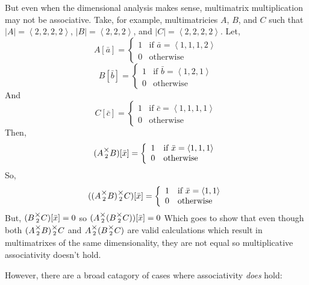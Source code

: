 \documentclass[12pt]{article}
\theoremstyle{definition}
\theoremstyle{plain}
\theoremstyle{ppart}
\newcommand{\mmult}[1]{\text{\raisebox{1ex}{$\underset{#1}{\times}$}}}
\begin{document}
But even when the dimensional analysis makes sense, multimatrix multiplication
may not be associative. Take, for example, multimatricies $A$, $B$, and $C$ such
that $|A| = \left<2,2,2,2\right>$, $|B| = \left<2,2,2\right>$, and
$|C| = \left<2,2,2,2\right>$. Let,
\[
 A[\bar{a}] = 
  \left\{
    \begin{array}{ll}
      1 & \mbox{if } \bar{a} = \left<1,1,1,2\right> \\
      0 & \mbox{otherwise}
    \end{array}
  \right.
\]
\[
 B[\bar{b}] = 
  \left\{
    \begin{array}{ll}
      1 & \mbox{if } \bar{b} = \left<1,2,1\right> \\
      0 & \mbox{otherwise}
    \end{array}
  \right.
\]
And
\[
 C[\bar{c}] = 
  \left\{
    \begin{array}{ll}
      1 & \mbox{if } \bar{c} = \left<1,1,1,1\right> \\
      0 & \mbox{otherwise}
    \end{array}
  \right.
\]
Then,
\[
 (A \mmult{2} B)[\bar{x}] = 
  \left\{
    \begin{array}{ll}
      1 & \mbox{if } \bar{x} = \left<1,1,1\right> \\
      0 & \mbox{otherwise}
    \end{array}
  \right.
\]
So,
\[
 ((A \mmult{2} B) \mmult{2} C)[\bar{x}] = 
  \left\{
    \begin{array}{ll}
      1 & \mbox{if } \bar{x} = \left<1,1\right> \\
      0 & \mbox{otherwise}
    \end{array}
  \right.
\]
But, $(B \mmult{2} C)[\bar{x}] = 0$ so $(A \mmult{2} (B \mmult{2} C))[\bar{x}] = 0$
Which goes to show that even though both $(A \mmult{2} B) \mmult{2} C$ and
$A \mmult{2} (B \mmult{2} C)$ are valid calculations which result in multimatrixes
of the same dimensionality, they are not equal so multiplicative associativity
doesn't hold.

However, there are a broad catagory of cases where associativity \textit{does} hold:
\end{document}
